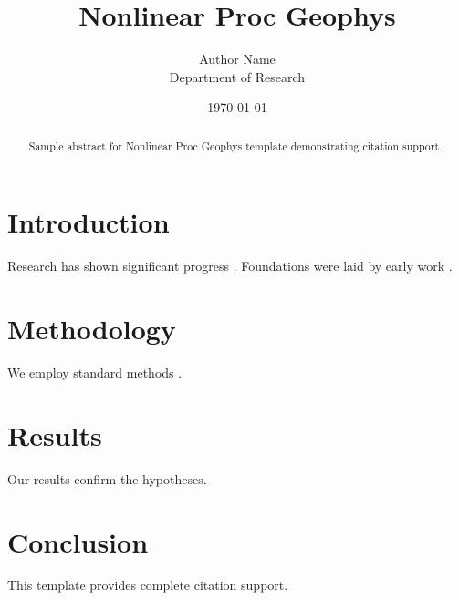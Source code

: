 \documentclass{aip-cp}
\title{Nonlinear Proc Geophys}
\author{Author Name \\ \small Department of Research}
\date{\today}
\begin{document}
\maketitle

\begin{abstract}
Sample abstract for Nonlinear Proc Geophys template demonstrating citation support.
\end{abstract}

\section{Introduction}
Research has shown significant progress \citep{einstein1905}. Foundations were laid by early work \citep{turing1950}.

\section{Methodology}
We employ standard methods \citep{knuth1984}.

\section{Results}
Our results confirm the hypotheses.

\section{Conclusion}
This template provides complete citation support.



\end{document}
